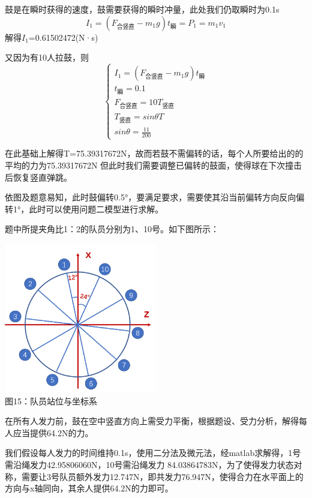\documentclass[UTF8]{article}
\begin{document}
鼓是在瞬时获得的速度，鼓需要获得的瞬时冲量，此处我们仍取瞬时为0.1s
\begin{equation}
    I_1=(F_{\mbox{合竖直}}-m_1g)t_{\mbox{瞬}}=P_1=m_1v_1
\end{equation}
解得$I_1$=0.61502472(N·s)

又因为有10人拉鼓，则
\begin{equation}
    \begin{cases}
        I_1=(F_{\mbox{合竖直}}-m_1g)t_{\mbox{瞬}}\\
        t_{\mbox{瞬}}=0.1\\
        F_{\mbox{合竖直}}=10T_{\mbox{竖直}}\\
        T_{\mbox{竖直}}=sin\theta T\\
        sin\theta=\frac{11}{200}
    \end{cases}
\end{equation}

在此基础上解得T=75.39317672‬N，故而若鼓不需偏转的话，每个人所要给出的的平均的力为75.39317672N
但此时我们需要调整已偏转的鼓面，使得球在下次撞击后恢复竖直弹跳。

依图及题意易知，此时鼓偏转0.5°，要满足要求，需要使其沿当前偏转方向反向偏转1°，此时可以使用问题二模型进行求解。

题中所提夹角比1：2的队员分别为1、10号。如下图所示：
\begin{center}
    \includegraphics[width=0.5\textwidth]{figure16.png}\\ 
    图15：队员站位与坐标系
\end{center}

在所有人发力前，鼓在空中竖直方向上需受力平衡，根据题设、受力分析，解得每人应当提供64.2N的力。

我们假设每人发力的时间维持0.1s，使用二分法及微元法，经matlab求解得，1号需沿绳发力42.95806060N，10号需沿绳发力 84.03864783N，为了使得发力状态对称，需要让3号队员额外发力12.747N，即共发力76.947N，使得合力在水平面上的方向与x轴同向，其余人提供64.2N的力即可。
\end{document}
